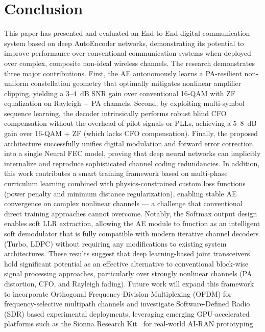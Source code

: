 \documentclass{JECnew}
\begin{document}
\section{Conclusion}

{\color{blue}This paper has presented and evaluated an End-to-End digital communication system based on deep AutoEncoder networks, demonstrating its potential to improve performance over conventional communication systems when deployed over complex, composite non-ideal wireless channels. The research demonstrates three major contributions. First, the AE autonomously learns a PA-resilient non-uniform constellation geometry that optimally mitigates nonlinear amplifier clipping, yielding a $3$--$4$~dB SNR gain over conventional 16-QAM with ZF equalization on Rayleigh + PA channels. Second, by exploiting multi-symbol sequence learning, the decoder intrinsically performs robust blind CFO compensation without the overhead of pilot signals or PLLs, achieving a $5$--$8$~dB gain over 16-QAM + ZF (which lacks CFO compensation). Finally, the proposed architecture successfully unifies digital modulation and forward error correction into a single Neural FEC model, proving that deep neural networks can implicitly internalize and reproduce sophisticated channel coding redundancies.} {\color{blue}In addition, this work contributes a smart training framework based on multi-phase curriculum learning combined with physics-constrained custom loss functions (power penalty and minimum distance regularization), enabling stable AE convergence on complex nonlinear channels --- a challenge that conventional direct training approaches cannot overcome. Notably, the Softmax output design enables soft LLR extraction, allowing the AE module to function as an intelligent soft demodulator that is fully compatible with modern iterative channel decoders (Turbo, LDPC) without requiring any modifications to existing system architectures.} {\color{blue}These results suggest that deep learning-based joint transceivers hold significant potential as an effective alternative to conventional block-wise signal processing approaches, particularly over strongly nonlinear channels (PA distortion, CFO, and Rayleigh fading). Future work will expand this framework to incorporate Orthogonal Frequency-Division Multiplexing (OFDM) for frequency-selective multipath channels and investigate Software-Defined Radio (SDR) based experimental deployments, leveraging emerging GPU-accelerated platforms such as the Sionna Research Kit~\cite{cammerer2025} for real-world AI-RAN prototyping.}
\end{document}
